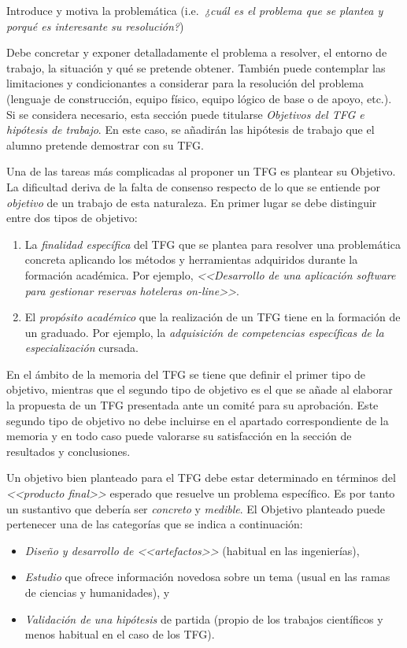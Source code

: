 Introduce y motiva la problemática (i.e.\emph{\ ¿cuál es el problema que se plantea y porqué es interesante su resolución?})

Debe concretar y exponer detalladamente el problema a resolver, el entorno de trabajo, la situación y qué se pretende obtener. También puede contemplar las limitaciones y condicionantes a considerar para la resolución del problema (lenguaje de construcción, equipo físico, equipo lógico de base o de apoyo, etc.). Si se considera necesario, esta sección puede titularse \emph{Objetivos del TFG e hipótesis de trabajo}. En este caso, se añadirán las hipótesis de trabajo que el alumno pretende demostrar con su TFG.

Una de las tareas más complicadas al proponer un TFG es plantear su \textsf{Objetivo}. La dificultad deriva de la falta de consenso respecto de lo que se entiende por \emph{objetivo} de un trabajo de esta naturaleza. En primer lugar se debe distinguir entre dos tipos de objetivo:

\begin{enumerate}
	\item La \emph{finalidad específica} del TFG que se plantea para resolver una problemática concreta aplicando los métodos y herramientas adquiridos durante la formación académica. Por ejemplo, \emph{<<Desarrollo de una aplicación software para gestionar reservas hoteleras \emph{on-line}>>}.
	
	\item El \emph{propósito académico} que la realización de un TFG tiene en la formación de un graduado. Por ejemplo, la \emph{adquisición de competencias específicas de la especialización} cursada.
\end{enumerate}

En el ámbito de la memoria del TFG se tiene que definir el primer tipo de objetivo, mientras que el segundo tipo de objetivo es el que se añade al elaborar la propuesta de un TFG presentada ante un comité para su aprobación. Este segundo tipo de objetivo no debe incluirse en el apartado correspondiente de la memoria y en todo caso puede valorarse su satisfacción en la sección de resultados y conclusiones.

Un objetivo bien planteado para el TFG debe estar determinado en términos del \emph{<<producto final>>} esperado que resuelve un problema específico. Es por tanto un sustantivo que debería ser \emph{concreto} y \emph{medible}. El \textsf{Objetivo} planteado puede pertenecer una de las categorías que se indica a continuación:
\begin{itemize}
	\item \emph{Diseño y desarrollo de <<artefactos>>} (habitual en las ingenierías),
	\item \emph{Estudio} que ofrece información novedosa sobre un tema (usual en las ramas de ciencias y humanidades), y
	\item \emph{Validación de una hipótesis} de partida (propio de los trabajos científicos y menos habitual en el caso de los TFG).
\end{itemize}

